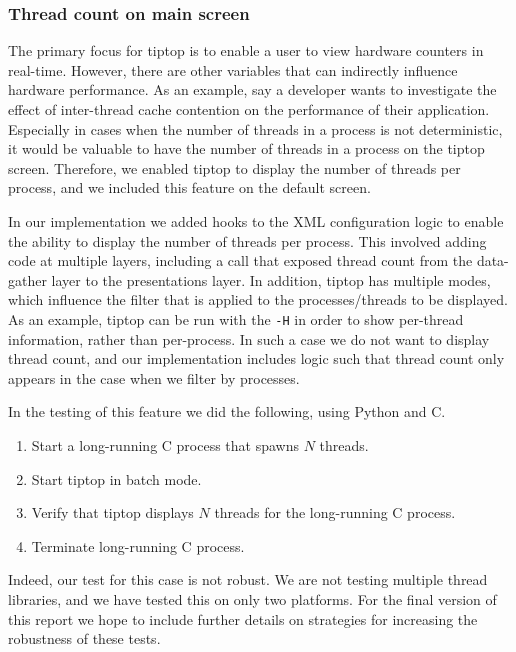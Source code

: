 \subsubsection{Thread count on main screen}
The primary focus for tiptop is to enable a user to view hardware counters in real-time.
However, there are other variables that can indirectly influence hardware performance.
As an example, say a developer wants to investigate the effect of inter-thread cache contention on the performance of their application.
Especially in cases when the number of threads in a process is not deterministic, it would be valuable to have the number of threads in a process on the tiptop screen. 
Therefore, we enabled tiptop to display the number of threads per process, and we included this feature on the default screen.

In our implementation we added hooks to the XML configuration logic to enable the ability to display the number of threads per process.
This involved adding code at multiple layers, including a call that exposed thread count from the data-gather layer to the presentations layer.
In addition, tiptop has multiple modes, which influence the filter that is applied to the processes/threads to be displayed.
As an example, tiptop can be run with the \texttt{-H} in order to show per-thread information, rather than per-process.
In such a case we do not want to display thread count, and our implementation includes logic such that thread count only appears in the case when we filter by processes.

In the testing of this feature we did the following, using Python and C.
\begin{enumerate}
\item Start a long-running C process that spawns $N$ threads.
\item Start tiptop in batch mode.
\item Verify that tiptop displays $N$ threads for the long-running C process.
\item Terminate long-running C process.
\end{enumerate}

Indeed, our test for this case is not robust. We are not testing multiple thread libraries, and we have tested this on only two platforms.
For the final version of this report we hope to include further details on strategies for increasing the robustness of these tests.

